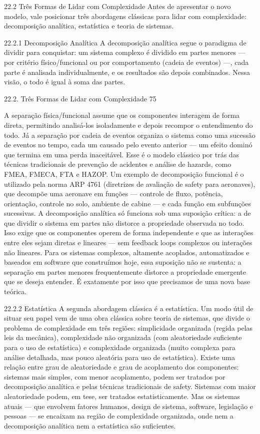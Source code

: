 22.2 Três Formas de Lidar com Complexidade Antes de apresentar o novo modelo, vale posicionar três abordagens clássicas para lidar com complexidade: decomposição analítica, estatística e teoria de sistemas.

22.2.1 Decomposição Analítica A decomposição analítica segue o paradigma de dividir para conquistar: um sistema complexo é dividido em partes menores — por critério físico/funcional ou por comportamento (cadeia de eventos) —, cada parte é analisada individualmente, e os resultados são depois combinados. Nessa visão, o todo é igual à soma das partes.

22.2. Três Formas de Lidar com Complexidade 75

A separação física/funcional assume que os componentes interagem de forma direta, permitindo analisá-los isoladamente e depois recompor o entendimento do todo. Já a separação por cadeia de eventos organiza o sistema como uma sucessão de eventos no tempo, cada um causado pelo evento anterior — um efeito dominó que termina em uma perda inaceitável. Esse é o modelo clássico por trás das técnicas tradicionais de prevenção de acidentes e análise de hazards, como FMEA, FMECA, FTA e HAZOP. Um exemplo de decomposição funcional é o utilizado pela norma ARP 4761 (diretrizes de avaliação de safety para aeronaves), que decompõe uma aeronave em funções — controle de fluxo, potência, orientação, controle no solo, ambiente de cabine — e cada função em subfunções sucessivas. A decomposição analítica só funciona sob uma suposição crítica: a de que dividir o sistema em partes não distorce a propriedade observada no todo. Isso exige que os componentes operem de forma independente e que as interações entre eles sejam diretas e lineares — sem feedback loops complexos ou interações não lineares. Para os sistemas complexos, altamente acoplados, automatizados e baseados em software que construímos hoje, essa suposição não se sustenta: a separação em partes menores frequentemente distorce a propriedade emergente que se deseja entender. É exatamente por isso que precisamos de uma nova base teórica.

22.2.2 Estatística A segunda abordagem clássica é a estatística. Um modo útil de situar seu papel vem de uma obra clássica sobre teoria de sistemas, que divide o problema de complexidade em três regiões: simplicidade organizada (regida pelas leis da mecânica), complexidade não organizada (com aleatoriedade suficiente para o uso de estatística) e complexidade organizada (muito complexa para análise detalhada, mas pouco aleatória para uso de estatística). Existe uma relação entre grau de aleatoriedade e grau de acoplamento dos componentes: sistemas mais simples, com menor acoplamento, podem ser tratados por decomposição analítica e pelas técnicas tradicionais de safety. Sistemas com maior aleatoriedade podem, em tese, ser tratados estatisticamente. Mas os sistemas atuais — que envolvem fatores humanos, design de sistema, software, legislação e pessoas — se encaixam na região de complexidade organizada, onde nem a decomposição analítica nem a estatística são suficientes.

